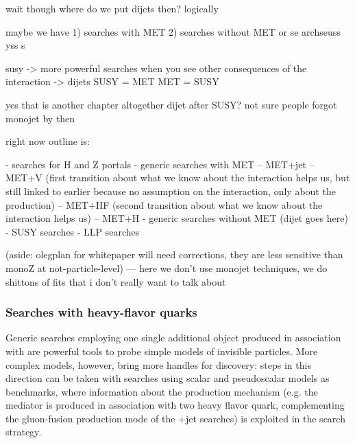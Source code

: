 wait though
where do we put dijets then? logically

maybe we have 1) searches with MET 2) searches without MET
or 
se
archseuss yss
s

susy -> more powerful searches when you see other consequences of the interaction -> dijets
SUSY = MET
MET = SUSY


yes that is another chapter altogether
dijet after SUSY?
not sure
people forgot monojet by then

right now outline is:

- searches for H and Z portals
- generic searches with MET
-- MET+jet
-- MET+V
(first transition about what we know about the interaction helps us, but still linked to earlier because no assumption on the interaction, only about the production)
-- MET+HF
(second transition about what we know about the interaction helps us)
-- MET+H
- generic searches without MET (dijet goes here)
- SUSY searches
- LLP searches


(aside: olegplan for whitepaper will need corrections, they are less sensitive than monoZ at not-particle-level)
--- here we don't use monojet techniques, we do shittons of fits that i don't really want to talk about


\subsubsection{Searches with heavy-flavor quarks}

Generic searches employing one single additional object produced in association with \MET
are powerful tools to probe simple models of invisible particles. More complex models, however, bring 
more handles for discovery: steps in this direction can be taken with searches using 
scalar and pseudoscalar models as benchmarks, where information about the production mechanism 
(e.g. the mediator is produced in association with two heavy flavor quark, complementing the
gluon-fusion production mode of the \MET+jet searches) is exploited in 
the search strategy. 

